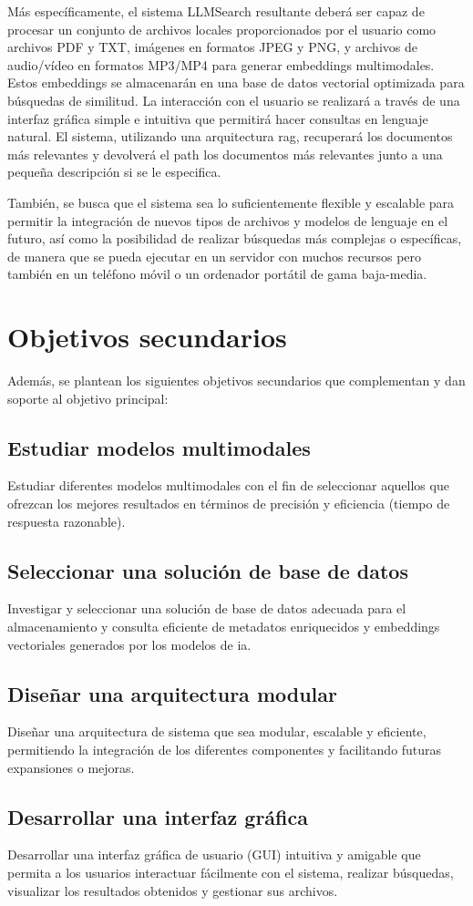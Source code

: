 Más específicamente, el sistema LLMSearch resultante deberá ser capaz de procesar un conjunto de archivos locales proporcionados por el usuario como archivos PDF y TXT, imágenes en formatos JPEG y PNG, y archivos de audio/vídeo en formatos MP3/MP4 para generar embeddings multimodales. Estos embeddings se almacenarán en una base de datos vectorial optimizada para búsquedas de similitud. La interacción con el usuario se realizará a través de una interfaz gráfica simple e intuitiva que permitirá hacer consultas en lenguaje natural. El sistema, utilizando una arquitectura \gls{rag}, recuperará los documentos más relevantes y devolverá el path los documentos más relevantes junto a una pequeña descripción si se le especifica.

También, se busca que el sistema sea lo suficientemente flexible y escalable para permitir la integración de nuevos tipos de archivos y modelos de lenguaje en el futuro, así como la posibilidad de realizar búsquedas más complejas o específicas, de manera que se pueda ejecutar en un servidor con muchos recursos pero también en un teléfono móvil o un ordenador portátil de gama baja-media.

\section{Objetivos secundarios}
Además, se plantean los siguientes objetivos secundarios que complementan y dan soporte al objetivo principal:
\subsection{Estudiar modelos multimodales}
Estudiar diferentes modelos multimodales con el fin de seleccionar aquellos que ofrezcan los mejores resultados en términos de precisión y eficiencia (tiempo de respuesta razonable).
\subsection{Seleccionar una solución de base de datos}
Investigar y seleccionar una solución de base de datos adecuada para el almacenamiento y consulta eficiente de metadatos enriquecidos y embeddings vectoriales generados por los modelos de \gls{ia}.
\subsection{Diseñar una arquitectura modular}
Diseñar una arquitectura de sistema que sea modular, escalable y eficiente, permitiendo la integración de los diferentes componentes y facilitando futuras expansiones o mejoras.
\subsection{Desarrollar una interfaz gráfica}
Desarrollar una interfaz gráfica de usuario (GUI) intuitiva y amigable que permita a los usuarios interactuar fácilmente con el sistema, realizar búsquedas, visualizar los resultados obtenidos y gestionar sus archivos.
